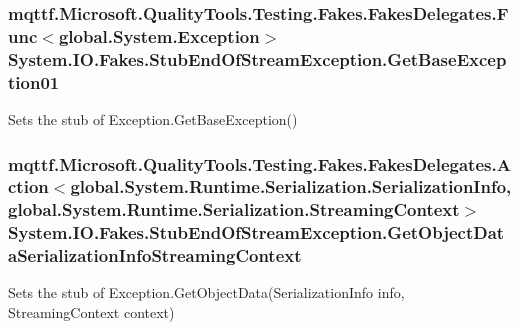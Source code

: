 \hypertarget{class_system_1_1_i_o_1_1_fakes_1_1_stub_end_of_stream_exception_a4d8e229e3cc457805dfaa4acfe921008}{
\subsubsection[{Get\-Base\-Exception01}]{\setlength{\rightskip}{0pt plus 5cm}mqttf.\-Microsoft.\-Quality\-Tools.\-Testing.\-Fakes.\-Fakes\-Delegates.\-Func$<$global.\-System.\-Exception$>$ System.\-I\-O.\-Fakes.\-Stub\-End\-Of\-Stream\-Exception.\-Get\-Base\-Exception01}}\label{class_system_1_1_i_o_1_1_fakes_1_1_stub_end_of_stream_exception_a4d8e229e3cc457805dfaa4acfe921008}


Sets the stub of Exception.\-Get\-Base\-Exception()

\hypertarget{class_system_1_1_i_o_1_1_fakes_1_1_stub_end_of_stream_exception_a8172f80d5a0a3f0c5174aff6f3996557}{
\subsubsection[{Get\-Object\-Data\-Serialization\-Info\-Streaming\-Context}]{\setlength{\rightskip}{0pt plus 5cm}mqttf.\-Microsoft.\-Quality\-Tools.\-Testing.\-Fakes.\-Fakes\-Delegates.\-Action$<$global.\-System.\-Runtime.\-Serialization.\-Serialization\-Info, global.\-System.\-Runtime.\-Serialization.\-Streaming\-Context$>$ System.\-I\-O.\-Fakes.\-Stub\-End\-Of\-Stream\-Exception.\-Get\-Object\-Data\-Serialization\-Info\-Streaming\-Context}}\label{class_system_1_1_i_o_1_1_fakes_1_1_stub_end_of_stream_exception_a8172f80d5a0a3f0c5174aff6f3996557}


Sets the stub of Exception.\-Get\-Object\-Data(\-Serialization\-Info info, Streaming\-Context context)

